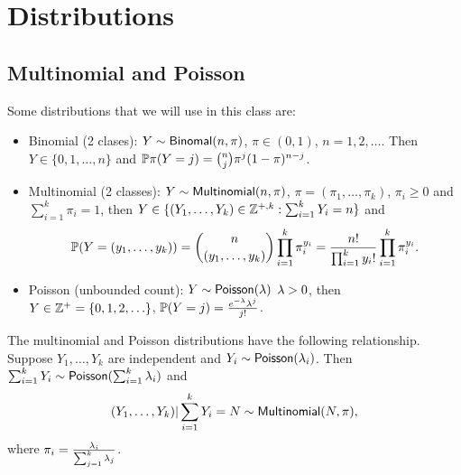 \section{Distributions}
\subsection{Multinomial and Poisson}
Some distributions that we will use in this class are:
\begin{itemize}
    \item Binomial (2 clases): $Y \sim \mathsf{Binomal}(n,\pi)$, $\pi \in (0,1)$, $n=1,2,\ldots$. Then $Y \in \{0,1,\ldots,n\}$ and ${\mathbb{P}}\pi(Y=j) = \binom{n}{j} \pi^j(1-\pi)^{n-j}$. 
    \item Multinomial (2 classes): $Y \sim \mathsf{Multinomial}(n,\pi)$, $\pi = (\pi_1,\ldots, \pi_k)$, $\pi_i \ge 0$ and $\sum_{i=1}^k \pi_i = 1$, then $Y \in \{(Y_1,\ldots,Y_k) \in {{\mathbb Z}}^{+,k}: \sum_{i=1}^k Y_i = n\}$ and 
    \[{\mathbb{P}}(Y=(y_1,\ldots,y_k)) = \binom{n}{(y_1,\ldots,y_k)} \prod_{i=1}^k \pi_i^{y_i} = \frac{n!}{\prod_{i=1}^k y_i!}\prod_{i=1}^k \pi_i^{y_i}.\]
    \item Poisson (unbounded count): $Y \sim \mathsf{Poisson}(\lambda) $ $\lambda > 0$, then $Y \in {{\mathbb Z}}^+ =\{0,1,2,\ldots\}$, ${\mathbb{P}}(Y=j) = \frac{e^{-\lambda}\lambda^j}{j!}$.
\end{itemize}
The multinomial and Poisson distributions have the following relationship. Suppose $Y_1,\ldots,Y_k$ are independent and $Y_i \sim \mathsf{Poisson}(\lambda_i)$. Then $\sum_{i=1}^k Y_i \sim \mathsf{Poisson}(\sum_{i=1}^k \lambda_i)$ and 
\[(Y_1,\ldots, Y_k)|\sum_{i=1}^k Y_i = N \sim \mathsf{Multinomial}(N,\pi), \]
where $\pi_i = \frac{\lambda_i}{\sum_{j=1}^k \lambda_j}$.
